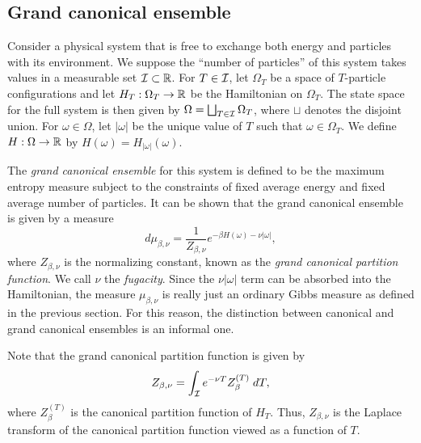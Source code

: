 
\subsection{Grand canonical ensemble}

Consider a physical system that is free to exchange both energy and particles with its environment. We suppose the ``number of particles'' of this system takes values in a measurable set $\mathcal{I} \subset {\mathbb R}$. For
$T \in \mathcal{I}$, let $\Omega_T$ be a space of $T$-particle configurations and let $H_T : \Omega_T \rightarrow {\mathbb R}$ be the Hamiltonian on $\Omega_T$. The state space for the full system is then given by
$\Omega = \bigsqcup_{T \in \mathcal{I}} \Omega_T$, where $\sqcup$ denotes the disjoint union. For $\omega\in\Omega$, let $|\omega|$ be the unique value of
$T$ such that $\omega \in \Omega_T$. We define $H : \Omega \rightarrow {\mathbb R}$ by
$H(\omega) = H_{|\omega|}(\omega)$.

The \emph{grand canonical ensemble} for this system is defined to be the maximum entropy measure subject to the constraints of fixed average energy and fixed average number of particles. It can be shown that the grand canonical ensemble is given by a measure
\begin{equation}
d\mu_{\beta,\nu}
  =
\frac{1}{Z_{\beta,\nu}} e^{-\beta H(\omega) - \nu |\omega|},
\end{equation}
where $Z_{\beta,\nu}$ is the normalizing constant, known as the \emph{grand canonical partition function}. We call $\nu$ the \emph{fugacity}. Since the
$\nu |\omega|$ term can be absorbed into the Hamiltonian, the measure $\mu_{\beta,\nu}$ is really just an ordinary Gibbs measure as defined in the previous section. For this reason, the distinction between canonical and grand canonical ensembles is an informal one.

\begin{rk}
Note that the grand canonical partition function is given by
\begin{equation}
Z_{\beta,\nu}
  =
\int_{\mathcal{I}} e^{-\nu T} Z_\beta^{(T)} \; dT,
\end{equation}
where $Z^{(T)}_\beta$ is the canonical partition function of $H_T$. Thus,
$Z_{\beta,\nu}$ is the Laplace transform of the canonical partition function
viewed as a function of $T$.
\end{rk}


